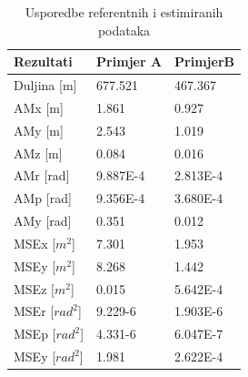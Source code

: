 \begin{table}[H]
  \centering
  \begin{tabular}{ |p{3cm}| |p{3cm}|p{3cm}| }
    \hline
    Rezultati& Primjer A& PrimjerB\\
    \hline
    Duljina [m]& 677.521& 467.367\\
    AMx [m]& 1.861& 0.927\\
    AMy [m]& 2.543& 1.019\\
    AMz [m]& 0.084& 0.016\\
    AMr [rad]& 9.887E-4& 2.813E-4\\
    AMp [rad]& 9.356E-4& 3.680E-4\\
    AMy [rad]& 0.351& 0.012\\
    \hline
    MSEx [$m^2$]& 7.301& 1.953\\
    MSEy [$m^2$]& 8.268& 1.442\\
    MSEz [$m^2$]& 0.015& 5.642E-4\\
    MSEr [$rad^2$]& 9.229-6& 1.903E-6\\
    MSEp [$rad^2$]& 4.331-6& 6.047E-7\\
    MSEy [$rad^2$]& 1.981& 2.622E-4\\
    \hline
  \end{tabular}
  \caption{Usporedbe referentnih i estimiranih podataka}
  \label{res:ref_est_table}
\end{table}
\pagebreak

